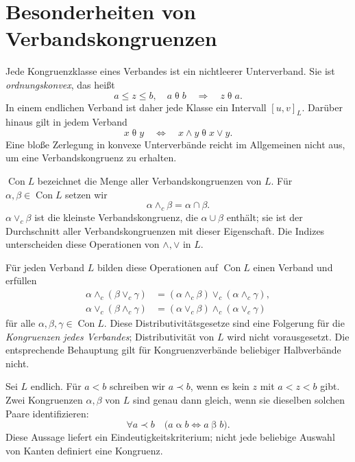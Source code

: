 \section{Besonderheiten von Verbandskongruenzen}

\begin{theorem}
\label{b45guide:thm:classes}
Jede Kongruenzklasse eines Verbandes ist ein nichtleerer Unterverband.
Sie ist \emph{ordnungskonvex}, das heißt
\[
 a\leq z\leq b,\quad a\mathrel\theta b
 \quad\Longrightarrow\quad z\mathrel\theta a.
\]
In einem endlichen Verband ist daher jede Klasse ein Intervall
$[u,v]_L$. Darüber hinaus gilt in jedem Verband
\[
 x\mathrel\theta y
 \quad\Longleftrightarrow\quad
 x\wedge y\mathrel\theta x\vee y .
\]
Eine bloße Zerlegung in konvexe Unterverbände reicht im Allgemeinen
nicht aus, um eine Verbandskongruenz zu erhalten. \cite{nation-con}
\end{theorem}

\begin{definition}[Kongruenzverband]
\label{b45guide:def:con}
$\operatorname{Con}L$ bezeichnet die Menge aller Verbandskongruenzen
von $L$. Für $\alpha,\beta\in\operatorname{Con}L$ setzen wir
\[
 \alpha\wedge_c\beta=\alpha\cap\beta.
\]
$\alpha\vee_c\beta$ ist die kleinste Verbandskongruenz, die
$\alpha\cup\beta$ enthält; sie ist der Durchschnitt aller
Verbandskongruenzen mit dieser Eigenschaft.
Die Indizes unterscheiden diese Operationen von $\wedge,\vee$ in $L$.
\end{definition}

\begin{theorem}
\label{b45guide:thm:funayama}
Für jeden Verband $L$ bilden diese Operationen auf
$\operatorname{Con}L$ einen Verband und erfüllen
\[
\begin{aligned}
 \alpha\wedge_c(\beta\vee_c\gamma)
   &=(\alpha\wedge_c\beta)\vee_c(\alpha\wedge_c\gamma),\\
 \alpha\vee_c(\beta\wedge_c\gamma)
   &=(\alpha\vee_c\beta)\wedge_c(\alpha\vee_c\gamma)
\end{aligned}
\]
für alle $\alpha,\beta,\gamma\in\operatorname{Con}L$.
Diese Distributivitätsgesetze sind eine Folgerung für die
\emph{Kongruenzen jedes Verbandes}; Distributivität von $L$
wird nicht vorausgesetzt. Die entsprechende Behauptung gilt
für Kongruenzverbände beliebiger Halbverbände nicht. \cite{nation-con,freese-nation}
\end{theorem}

\begin{theorem}
\label{b45guide:thm:edges}
Sei $L$ endlich. Für $a<b$ schreiben wir $a\prec b$, wenn es
kein $z$ mit $a<z<b$ gibt.
Zwei Kongruenzen $\alpha,\beta$ von $L$ sind genau dann gleich,
wenn sie dieselben solchen Paare identifizieren:
\[
 \forall a\prec b\quad
 \bigl(a\mathrel\alpha b\iff a\mathrel\beta b\bigr).
\]
Diese Aussage liefert ein Eindeutigkeitskriterium;
nicht jede beliebige Auswahl von Kanten definiert eine Kongruenz.
\end{theorem}
